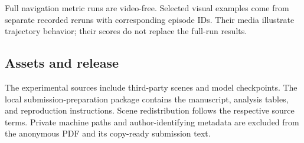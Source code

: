 Full navigation metric runs are video-free. Selected visual examples come from
separate recorded reruns with corresponding episode IDs. Their media illustrate
trajectory behavior; their scores do not replace the full-run results.

\subsection{Assets and release}
The experimental sources include third-party scenes and model checkpoints.
The local submission-preparation package contains the manuscript, analysis
tables, and reproduction instructions. Scene redistribution follows the
respective source terms. Private machine paths and author-identifying metadata
are excluded from the anonymous PDF and its copy-ready submission text.
